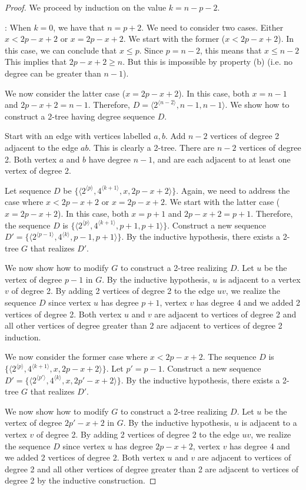 \documentclass[lotsofwhite,charterfonts]{patmorin}
\newcommand{\rep}[1]{^{\langle#1\rangle}}
\begin{document}
\begin{proof}
We proceed by induction on the value $k=n-p-2$. 

: When $k=0$, we have that $n=p+2$.
We need to consider two cases. Either $x<2p-x+2$ or $x=2p-x+2$. We
start with the former ($x<2p-x+2$).  In this case, we can conclude
that $x\leq p$. Since $p=n-2$, this means that $x\leq n-2$ This
implies that $2p-x+2\geq n$. But this is impossible by property (b)
(i.e.  no degree can be greater than $n-1$).

We now consider the latter case ($x=2p-x+2$). In this case, both
$x=n-1$ and $2p-x+2=n-1$. Therefore, $D=\langle
2\rep{n-2},n-1,n-1\rangle$.  We show how to construct a 2-tree having
degree sequence $D$.

Start with an edge with vertices labelled $a, b$.  Add $n-2$ vertices
of degree 2 adjacent to the edge $ab$. This is clearly a 2-tree. There
are $n-2$ vertices of degree 2. Both vertex $a$ and $b$ have degree
$n-1$, and are each adjacent to at least one vertex of degree 2.

 Let sequence $D$ be $\{ \langle
2\rep{p},4\rep{k+1},x,2p-x+2\rangle\}$. Again, we need to address the
case where $x<2p-x+2$ or $x=2p-x+2$. We start with the latter case
($x=2p-x+2$).  In this case, both $x=p+1$ and $2p-x+2=p+1$.
Therefore, the sequence $D$ is $\{ \langle
2\rep{p},4\rep{k+1},p+1,p+1\rangle\}$.  Construct a new sequence $D' =
\{ \langle 2\rep{p-1},4\rep{k},p-1,p+1\rangle\}$. By the inductive
hypothesis, there exists a 2-tree $G$ that realizes $D'$. 

We now show how to modify $G$ to construct a 2-tree realizing $D$.
Let $u$ be the vertex of degree $p-1$ in $G$.  By the inductive
hypothesis, $u$ is adjacent to a vertex $v$ of degree 2.  By adding 2
vertices of degree 2 to the edge $uv$, we realize the sequence $D$
since vertex $u$ has degree $p+1$, vertex $v$ has degree 4 and we
added 2 vertices of degree 2. Both vertex $u$ and $v$ are adjacent to
vertices of degree 2 and all other vertices of degree greater than 2
are adjacent to vertices of degree 2 induction.

We now consider the former case where $x<2p-x+2$.  The sequence $D$ is
$\{ \langle 2\rep{p},4\rep{k+1},x,2p-x+2\rangle\}$.  Let $p'=p-1$.
Construct a new sequence $D' = \{ \langle
2\rep{p'},4\rep{k},x,2p'-x+2\rangle\}$. By the inductive hypothesis,
there exists a 2-tree $G$ that realizes $D'$. 

We now show how to modify $G$ to construct a 2-tree realizing $D$.
Let $u$ be the vertex of degree $2p'-x+2$ in $G$.  By the inductive
hypothesis, $u$ is adjacent to a vertex $v$ of degree 2.  By adding 2
vertices of degree 2 to the edge $uv$, we realize the sequence $D$
since vertex $u$ has degree $2p-x+2$, vertex $v$ has degree 4 and we
added 2 vertices of degree 2. Both vertex $u$ and $v$ are adjacent to
vertices of degree 2 and all other vertices of degree greater than 2
are adjacent to vertices of degree 2 by the inductive construction.
\end{proof}
\end{document}
